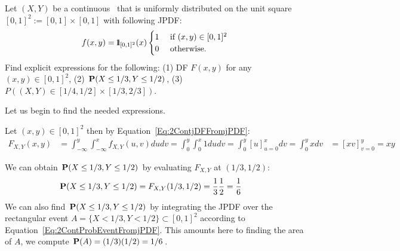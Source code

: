\begin{example}\label{Eg:Unif2DPDFandCDF}
Let $(X,Y)$ be a continuous \rv~that is uniformly distributed on the unit square $[0,1]^2 := [0,1] \times [0,1]$ with following JPDF:
\[
f(x,y) =  {1}\mspace{-11 mu}{1}_{[0,1]^2}(x) 
\begin{cases}
1 & \text{ if } (x,y) \in [0,1]^2 \\
0 & \text{ otherwise}.
\end{cases}
\]
Find explicit expressions for the following: (1) DF $F(x,y)$ for any $(x,y) \in [0,1]^2$, (2) $\mathbf{P}(X \leq 1/3, Y \leq 1/2)$, (3) $P\left( (X,Y) \in [1/4,1/2]\times[1/3,2/3] \right)$.

\begin{center}
\end{center}

Let us begin to find the needed expressions.
\be
\item
Let $(x,y) \in [0,1]^2$ then by Equation~\eqref{Eq:2ContjDFFromjPDF}:
{\small
\begin{align*}
F_{X,Y}(x,y) 
&= \int_{-\infty}^{y} \int_{-\infty}^{x} f_{X,Y}(u,v) dudv
= \int_{0}^{y} \int_{0}^{{x}} 1 dudv
= \int_{0}^{y} \left[ u \right]_{u=0}^{x}  dv
= \int_{0}^{y} x  dv
&= \left[ x v \right]_{v=0}^{y}
= {x}{y}
\end{align*}
}
\item We can obtain $\mathbf{P}(X \leq 1/3, Y \leq 1/2)$ by evaluating $F_{X,Y}$ at $(1/3,1/2)$:
{\small
\begin{align*}
\mathbf{P}(X \leq 1/3, Y \leq 1/2)
&= F_{X,Y}(1/3,1/2)
= \frac{1}{3}\frac{1}{2}
= \frac{1}{6}
\end{align*}
}
We can also find $\mathbf{P}(X \leq 1/3, Y \leq 1/2)$ by integrating the JPDF over the rectangular event $A=\{X < 1/3, Y < 1/2 \} \subset [0,1]^2$ according to Equation~\eqref{Eq:2ContProbEventFromjPDF}.  
This amounts here to finding the area of $A$, we compute $\mathbf{P}(A) = (1/3) (1/2) = 1/6$.  


\end{example}
